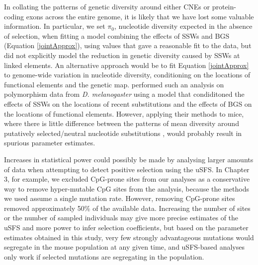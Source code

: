 {	In collating the patterns of genetic diversity around either CNEs or protein-coding exons across the entire genome, it is likely that we have lost some valuable information. In particular, we set $\pi_0$, nucleotide diversity expected in the absence of selection, when fitting a model combining the effects of SSWs and BGS (Equation \ref{jointApprox}), using values that gave a reasonable fit to the data, but did not explicitly model the reduction in genetic diversity caused by SSWs at linked elements.	An alternative approach would be to fit Equation \ref{jointApprox} to genome-wide variation in nucleotide diversity, conditioning on the locations of functional elements and the genetic map. \cite{RN274} performed such an analysis on polymorphism data from \textit{D. melanogaster} using a model that condiditoned the effects of SSWs on the locations of recent substitutions and the effects of BGS on the locations of functional elements. However, applying their methods to mice, where there is little difference between the patterns of mean diversity around putatively selected/neutral nucleotide substitutions \cite{RN122}, would probably result in spurious parameter estimates. 
		
	Increases in statistical power could possibly be made by analysing larger amounts of data when attempting to detect positive selection using the uSFS. In Chapter 3, for example, we excluded CpG-prone sites from our analyses as a conservative way to remove hyper-mutable CpG sites from the analysis, because the methods we used assume a single mutation rate. However, removing CpG-prone sites removed approximately 50\% of the available data. Increasing the number of sites or the number of sampled individuals may give more precise estimates of the uSFS and more power to infer selection coefficients, but based on the parameter estimates obtained in this study, very few strongly advantageous mutations would segregate in the mouse population at any given time, and uSFS-based analyses only work if selected mutations are segregating in the population. 

}

